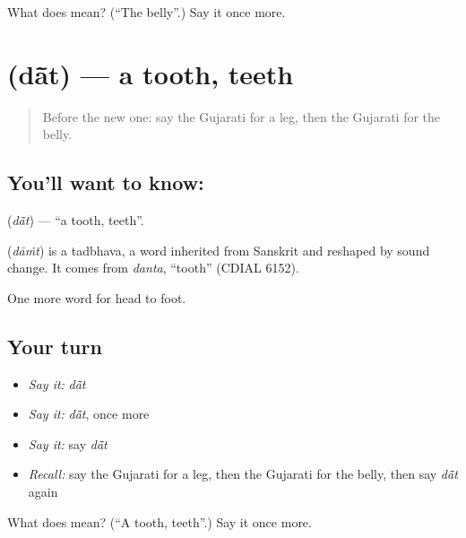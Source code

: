 \begin{tcolorbox}[breakable,colback=teal!4,colframe=teal!35!black,title={Before you move on}]
What does  mean? (\textquotedblleft{}The belly\textquotedblright{}.) Say it once more.
\end{tcolorbox}
\section[\texorpdfstring{\gu{દાંત} (dā̃t)}{દાંત (dā̃t)}]{ (dā̃t) — a tooth, teeth}

\label{lesson:GU-C46-tooth}



\begin{quote}
Before the new one: say the Gujarati for a leg, then the Gujarati for the belly.
\end{quote}

\subsection*{You'll want to know: }
\textbf{} (\emph{dā̃t}) — \textquotedblleft{}a tooth, teeth\textquotedblright{}.

\begin{cousinweb}
\textbf{} (\emph{dāṁt}) is a tadbhava, a word inherited from Sanskrit and reshaped by sound change. It comes from \emph{danta}, \textquotedblleft{}tooth\textquotedblright{} (CDIAL 6152).
\end{cousinweb}

\begin{grammarlens}[title={What you've built}]
One more word for head to foot.
\end{grammarlens}

\subsection*{Your turn}
\begin{itemize}
\raggedright
  \item \emph{Say it:} \emph{dā̃t}
  \item \emph{Say it:} \emph{dā̃t}, once more
  \item \emph{Say it:} say \emph{dā̃t}
  \item \emph{Recall:} say the Gujarati for a leg, then the Gujarati for the belly, then say \emph{dā̃t} again
\end{itemize}

\begin{tcolorbox}[breakable,colback=teal!4,colframe=teal!35!black,title={Before you move on}]
What does  mean? (\textquotedblleft{}A tooth, teeth\textquotedblright{}.) Say it once more.
\end{tcolorbox}
